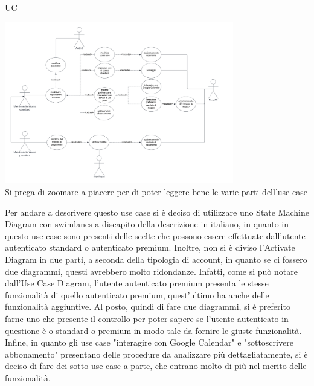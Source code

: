 \begin{listaPersonale}{UC}
\begin{listaPersonale2}[UC] {}


    \end{listaPersonale2}





    \newpage

    \begin{center}
        \includegraphics[width=0.75\textwidth, height = 0.35\textheight]{img/Diagrammi/UseCases/ImpostazioniAccount.png}\\
        Si prega di zoomare a piacere per di poter leggere bene le varie parti dell'use case
    \end{center}
    Per andare a descrivere questo use case si è deciso di utilizzare uno State Machine Diagram con swimlanes a discapito della descrizione in italiano, in quanto in questo use case sono presenti delle scelte che possono essere effettuate dall'utente autenticato standard o autenticato premium. Inoltre, non si è diviso l'Activate Diagram in due parti, a seconda della tipologia di account, in quanto se ci fossero due diagrammi, questi avrebbero molto ridondanze. Infatti, come si può notare dall'Use Case Diagram, l'utente autenticato premium presenta le stesse funzionalità di quello autenticato premium, quest'ultimo ha anche delle funzionalità aggiuntive. Al posto, quindi di fare due diagrammi, si è preferito farne uno che presente il controllo per poter sapere se l'utente autenticato in questione è o standard o premium in modo tale da fornire le giuste funzionalità.
    Infine, in quanto gli use case "interagire con Google Calendar" e "sottoscrivere abbonamento" presentano delle procedure da analizzare più dettagliatamente, si è deciso di fare dei sotto use case a parte, che entrano molto di più nel merito delle funzionalità.


\end{listaPersonale}
